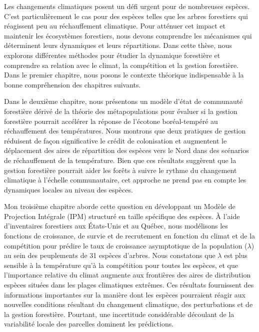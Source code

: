 Les changements climatiques posent un défi urgent pour de nombreuses espèces. C'est particulièrement le cas pour des espèces telles que les arbres forestiers qui réagissent peu au réchauffement climatique. Pour atténuer cet impact et maintenir les écosystèmes forestiers, nous devons comprendre les mécanismes qui déterminent leurs dynamiques et leurs répartitions. Dans cette thèse, nous explorons différentes méthodes pour étudier la dynamique forestière et comprendre sa relation avec le climat, la compétition et la gestion forestière. 
Dans le premier chapitre, nous posons le contexte théorique indispensable à la bonne compréhension des chapitres suivants.

Dans le deuxième chapitre, nous présentons un modèle d'état de communauté forestière dérivé de la théorie des métapopulations pour évaluer si la gestion forestière pourrait accélérer la réponse de l'écotone boréal-tempéré au réchauffement des températures. Nous montrons que deux pratiques de gestion réduisent de façon significative le crédit de colonisation et augmentent le déplacement des aires de répartition des espèces vers le Nord dans des scénarios de réchauffement de la température. Bien que ces résultats suggèrent que la gestion forestière pourrait aider les forêts à suivre le rythme du changement climatique à l'échelle communautaire, cet approche ne prend pas en compte les dynamiques locales au niveau des espèces.

Mon troisième chapitre aborde cette question en développant un Modèle de Projection Intégrale (IPM) structuré en taille spécifique des espèces. À l'aide d'inventaires forestiers aux États-Unis et au Québec, nous modélisons les fonctions de croissance, de survie et de recrutement en fonction du climat et de la compétition pour prédire le taux de croissance asymptotique de la population ($\lambda$) au sein des peuplements de 31 espèces d'arbres. Nous constatons que $\lambda$ est plus sensible à la température qu'à la compétition pour toutes les espèces, et que l'importance relative du climat augmente aux frontières des aires de distribution espèces situées dans les plages climatiques extrêmes. Ces résultats fournissent des informations importantes sur la manière dont les espèces pourraient réagir aux nouvelles conditions résultant du changement climatique, des perturbations et de la gestion forestière. Pourtant, une incertitude considérable découlant de la variabilité locale des parcelles dominent les prédictions.

